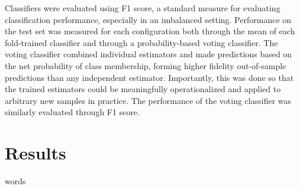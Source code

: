 \documentclass[fleqn,10pt]{SelfArx} %
\begin{document}
Classifiers were evaluated using F1 score, a standard measure for evaluating classification performance, especially in
an imbalanced setting. Performance on the test set was measured for each configuration both through the mean of each
fold-trained classifier and through a probability-based voting classifier. The voting classifier combined individual
estimators and made predictions based on the net probability of class membership, forming higher fidelity out-of-sample
predictions than any independent estimator. Importantly, this was done so that the trained estimators could be
meaningfully operationalized and applied to arbitrary new samples in practice. The performance of the voting classifier
was similarly evaluated through F1 score.


\section*{Results}
words
\end{document}
